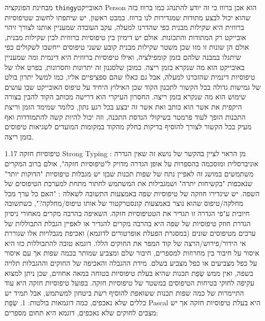       מבחינת הפונקציה \verb+thingy+האובייקט Person הוא אכן ברווז כי זה
      יודע להתנהג כמו ברווז בזה שהוא יכול לבצע מתודות שמגדירות לנו ברווז. במבט
      ראשון, יש שיתפתו לחשוב שטיפוסיות ברווזית היא שקילות מבנית כפי שהדרנו
      למעלה, עקב העובדה שמעניין אותנו לצורך זיהוי אובייקט רק המתודות והתכונות.
      אולם יש דימיון בין טיפוסיות ברווזית לבין שקילות מבנית, אולם הן שונות זו
      מזו שכן משטר שקילות מבנית קובע ששני טיפוסים ייחשבו לשקולים כפי שיתגלו
      במבנה שלהם בזמן קומפילציה, ואילו טיפוסיות ברווזית היא דינמית ומה שמעניין
      באובייקט הוא מה שנקרא בזמן ריצה. כמובן שלסגנון זה יתרונות וחסרונות, בפרט
      אלו של טיפוסיות דינמית שהזכרנו למעלה, אבל גם כאלו שהם ספציפיים אליו, כמו
      למשל יתרון בולט של גמישות גדולה בכל הקשור לתכנון הקוד שכן האילוץ היחיד על
      טיפוס האובייקט שבו עושים שימוש הוא מה שנקרא בזמן ריצה. החסרון העיקרי הוא
      דרישה מכותב הקוד להבין בצורה היקפית את אשר הוא כותב ואת אשר זה יבצע בכל
      רגע נתון, כלומר שמימד הזמן וריצת התכנות הופך לעוד פרמטר בשיקולי הנדסת
      התכנה, וזה יכול להיות קשה להתמודדות ואף מעיק בכל הקשור לצורך להוסיף
      בדיקות כחלק מהקוד במקומות המועדים לשגיאות טיפוסים בזמן ריצה.

      1.17 טיפוסיות חזקה Strong Typing : מן הראוי לציין בהקשר של נושא זה שאין
      הגדרה אוניברסלית ומוסכמה בהספרות על אופן הגדרה מדויק ל"טיפוסיות חזקה",
      אולם ברוב המקרים משתמשים במושג זה לאפיין נתח של שפות תכנות שבןו יש מגבלות
      טיפוסיות "הדוקות יותר" שנאכפות "בקשיחות יתרה" ושמגבילות את המשתמש לחתור
      מתחת למערכת הטיפוסים של השפה. יש שיגדירו חוזקה של טיפוסיות שפה באמצעות
      התשובה לשאלה : "האם כל ערך מכל מחלקה/טיפוס שהוא נוצר באמצעות קונסטרקטור
      של אותו טיפוס/מחלקה?", כשתשובה חיובית ע"פי הגדרה זו תגדיר את הטטיפוסיות
      חזקה. השאיפה בהרבה מקרים מאחורי ניסיון הגדרת חוזק טיפוסיות של שפה היא
      בהרבה מקרים להגדיר או לאפיין הגבלת התבוללות של ערכים מטיפוסים שונים
      (במסגרת הפעלת אופרטורים לדוגמא) ואכיפת מגבלויות אלו שגוררת אי
      הידור/פירוש/הרצה של קוד המפר את החוקים הללו.
      דוגמא טובה להתבוללות כזו היא איסור על חיבור בין מחרוזות למספרים, חיבור שלם ומצביע שמותר בכמה שפות אך עם איסור על כפל מצביעים או כפל מצביע בשלם.
      מידת ההגבלה והאכיפה של החוקים וההגבלות תלויה בשפה, ואין ממש שְׂפַת תכנות שהיא בעלת טיפוסיות בטוחה במאה אחוזים, שכן ניתן למצוא עקיפה לחוקי בטיחות הטיפוסים במשטר של טיפוסיות חזקה.
      בפועל טיפוסיות חזקה היא עוד התיימרות של כמה שפות תכנות ששואפת להוסיף רשת ביטחון למשתמש, אבל תמיד יש כללים שלא נאכפים, כמה דוגמאות בולטות:
      1. שְׂפַת Pascal היא בעלת טיפוסיות חזקה אך יש מצבים לחוקים שלא נאכפים, דוגמא היא תחום מספרים:

